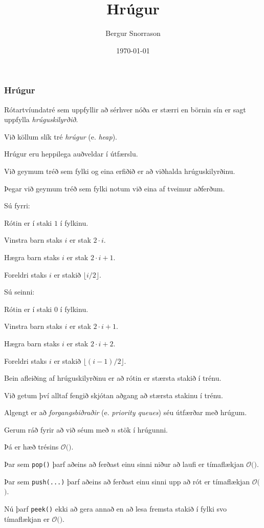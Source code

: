 \title{Hrúgur}
\author{Bergur Snorrason}
\date{\today}



\frame{\titlepage}

{
	\frametitle{Hrúgur}
	{
		\item<1-> Rótartvíundatré sem uppfyllir að sérhver nóða er stærri en börnin sín er sagt uppfylla \emph{hrúguskilyrðið}.
		\item<2-> Við köllum slík tré \emph{hrúgur} (e. \emph{heap}).
		\item<3-> Hrúgur eru heppilega auðveldar í útfærslu.
		\item<4-> Við geymum tréð sem fylki og eina erfiðið er að viðhalda hrúguskilyrðinu.
	}
}

{
	{
		\item<1-> Þegar við geymum tréð sem fylki notum við eina af tveimur aðferðum.
		\item<2-> Sú fyrri:
		{
			\item<3-> Rótin er í staki $1$ í fylkinu.
			\item<4-> Vinstra barn staks $i$ er stak $2 \cdot i$.
			\item<5-> Hægra barn staks $i$ er stak $2 \cdot i + 1$.
			\item<6-> Foreldri staks $i$ er stakið $\lfloor i/2 \rfloor$.
		}
		\item<7-> Sú seinni:
		{
			\item<8-> Rótin er í staki $0$ í fylkinu.
			\item<9-> Vinstra barn staks $i$ er stak $2\cdot i + 1$.
			\item<10-> Hægra barn staks $i$ er stak $2\cdot i + 2$.
			\item<11-> Foreldri staks $i$ er stakið $\lfloor (i - 1)/2 \rfloor$.
		}
	}
}

{
	{
		\item<1-> Bein afleiðing af hrúguskilyrðinu er að rótin er stærsta stakið í trénu.
		\item<2-> Við getum því alltaf fengið skjótan aðgang að stærsta stakinu í trénu.
		\item<3-> Algengt er að \emph{forgangsbiðraðir} (e. \emph{priority queues}) séu útfærðar með hrúgum.
	}
}

{
}

{
	{
		\item<1-> Gerum ráð fyrir að við séum með $n$ stök í hrúgunni.
		\item<2-> Þá er hæð trésins $\mathcal{O}($\onslide<3->{$\log n$}$)$.
		\item<4-> Þar sem \texttt{pop()} þarf aðeins að ferðast einu sinni niður að laufi er tímaflækjan $\mathcal{O}($\onslide<5->{$\log n$}$)$.
		\item<6-> Þar sem \texttt{push(...)} þarf aðeins að ferðast einu sinni upp að rót er tímaflækjan $\mathcal{O}($\onslide<7->{$\log n$}$)$.
		\item<8-> Nú þarf \texttt{peek()} ekki að gera annað en að lesa fremsta stakið í fylki svo tímaflækjan er $\mathcal{O}($\onslide<9->{$\,1\,$}$)$.
	}
}

{
}


